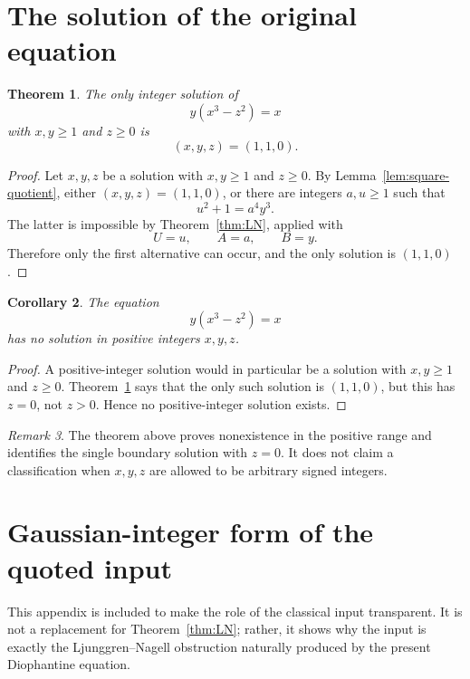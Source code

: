 \documentclass[a4paper,11pt]{amsart}
\newtheorem{theorem}{Theorem}[section]
\newtheorem{corollary}[theorem]{Corollary}
\theoremstyle{remark}
\newtheorem{remark}[theorem]{Remark}
\begin{document}
\section{The solution of the original equation}

\begin{theorem}\label{thm:main-nonnegative}
The only integer solution of
\[
        y(x^3-z^2)=x
\]
with $x,y\geq1$ and $z\geq0$ is
\[
        (x,y,z)=(1,1,0).
\]
\end{theorem}

\begin{proof}
Let $x,y,z$ be a solution with $x,y\geq1$ and $z\geq0$.  By
Lemma~\ref{lem:square-quotient}, either $(x,y,z)=(1,1,0)$, or there are
integers $a,u\geq1$ such that
\[
        u^2+1=a^4y^3.
\]
The latter is impossible by Theorem~\ref{thm:LN}, applied with
\[
        U=u,
        \qquad A=a,
        \qquad B=y.
\]
Therefore only the first alternative can occur, and the only solution is
$(1,1,0)$.
\end{proof}

\begin{corollary}\label{cor:positive}
The equation
\[
        y(x^3-z^2)=x
\]
has no solution in positive integers $x,y,z$.
\end{corollary}

\begin{proof}
A positive-integer solution would in particular be a solution with
$x,y\geq1$ and $z\geq0$.  Theorem~\ref{thm:main-nonnegative} says that the
only such solution is $(1,1,0)$, but this has $z=0$, not $z>0$.  Hence no
positive-integer solution exists.
\end{proof}

\begin{remark}
The theorem above proves nonexistence in the positive range and identifies the
single boundary solution with $z=0$.  It does not claim a classification when
$x,y,z$ are allowed to be arbitrary signed integers.
\end{remark}

\appendix

\section{Gaussian-integer form of the quoted input}\label{app:gaussian}

This appendix is included to make the role of the classical input transparent.
It is not a replacement for Theorem~\ref{thm:LN}; rather, it shows why the
input is exactly the Ljunggren--Nagell obstruction naturally produced by the
present Diophantine equation.
\end{document}
